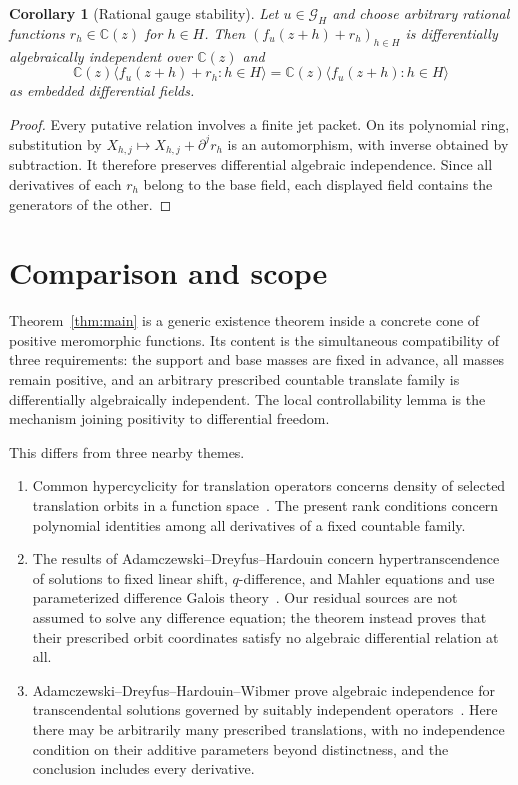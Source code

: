 \documentclass[11pt]{article}
\newtheorem{corollary}[theorem]{Corollary}
\newcommand{\C}{\mathbb C}
\newcommand{\cG}{\mathcal G}
\newcommand{\D}{\partial}
\begin{document}
\begin{corollary}[Rational gauge stability]\label{cor:gauge}
Let $u\in\cG_H$ and choose arbitrary rational functions $r_h\in\C(z)$ for $h\in H$.  Then
$(f_u(z+h)+r_h)_{h\in H}$ is differentially algebraically independent over $\C(z)$ and
\[
  \C(z)\langle f_u(z+h)+r_h:h\in H\rangle
  =\C(z)\langle f_u(z+h):h\in H\rangle
\]
as embedded differential fields.
\end{corollary}

\begin{proof}
Every putative relation involves a finite jet packet.  On its polynomial ring, substitution by
$X_{h,j}\mapsto X_{h,j}+\D^jr_h$ is an automorphism, with inverse obtained by subtraction.  It
therefore preserves differential algebraic independence.  Since all derivatives of each $r_h$
belong to the base field, each displayed field contains the generators of the other.
\end{proof}

\section{Comparison and scope}

Theorem~\ref{thm:main} is a generic existence theorem inside a concrete cone of positive
meromorphic functions.  Its content is the simultaneous compatibility of three requirements:
the support and base masses are fixed in advance, all masses remain positive, and an arbitrary
prescribed countable translate family is differentially algebraically independent.  The local
controllability lemma is the mechanism joining positivity to differential freedom.

This differs from three nearby themes.

\begin{enumerate}[leftmargin=*,itemsep=0.5em]
  \item Common hypercyclicity for translation operators concerns density of selected translation
  orbits in a function space~\cite{Tsirivas2014}.  The present rank conditions concern polynomial
  identities among all derivatives of a fixed countable family.

  \item The results of Adamczewski--Dreyfus--Hardouin concern hypertranscendence of solutions to
  fixed linear shift, $q$-difference, and Mahler equations and use parameterized difference
  Galois theory~\cite{ADH2021}.  Our residual sources are not assumed to solve any difference
  equation; the theorem instead proves that their prescribed orbit coordinates satisfy no
  algebraic differential relation at all.

  \item Adamczewski--Dreyfus--Hardouin--Wibmer prove algebraic independence for transcendental
  solutions governed by suitably independent operators~\cite{ADHW2024}.  Here there may be
  arbitrarily many prescribed translations, with no independence condition on their additive
  parameters beyond distinctness, and the conclusion includes every derivative.
\end{enumerate}
\end{document}
